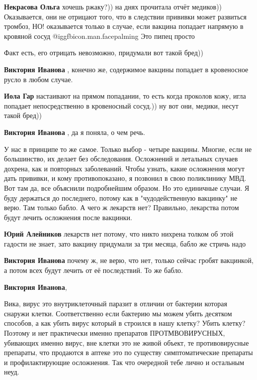 \begin{itemize}
\begin{itemize} %
\textbf{Некрасова Ольга} хочешь ржаку?)) на днях прочитала отчёт медиков))
Оказывается, они не отрицают того, что в следствии прививки может развиться тромбоз, НО! оказывается только в случае, если вакцина попадает напрямую в кровяной сосуд  @igg{fbicon.man.facepalming} 
Это пипец просто

Факт есть, его отрицать невозможно, придумали вот такой бред))

\textbf{Виктория Иванова} , конечно же, содержимое вакцины попадает в кровеносное русло в любом случае.

\textbf{Иола Гар} настаивают на прямом попадании, то есть когда проколов кожу, игла попадает непосредственно в кровеносный сосуд.)) ну вот они, медики, несут такой бред))

\textbf{Виктория Иванова} , да я поняла, о чем речь.
\end{itemize} %


У нас в принципе то же самое. Только выбор - четыре вакцины. Многие, если не
большинство, их делает без обследования. Осложнений и летальных случаев
дохрена, как и повторных заболеваний. Чтобы узнать, какие осложнения могут дать
прививки, и кому противопоказано, я позвонил в свою поликлинику МВД. Вот там
да, все объяснили подробнейшим образом. Но это единичные случаи. Я буду
держаться до последнего, потому как в "чудодейственную вакцинку" не верю. Там
только бабло. А чего ж лекарств нет? Правильно, лекарства потом будут лечить
осложнения после вакцинки.

\begin{itemize} %
\textbf{Юрий Алейников} лекарств нет потому, что никто нихрена толком об этой гадости не знает, зато вакцину придумали за три месяца, бабло же стричь надо

\textbf{Виктория Иванова} почему ж, не верю, что нет, только сейчас гробят вакцинкой, а потом всех будут лечить от её последствий. То же бабло.

\textbf{Виктория Иванова}, 

Вика, вирус это внутриклеточный паразит в отличии от бактерии которая снаружи
клетки. Соответственно если бактерию мы можем убить десятком способов, а как
убить вирус который в строился в нашу клетку? Убить клетку? Поэтому и нет
практически именно препаратов ПРОТМВОВИРУСНЫХ, убивающих именно вирус, вне
клетки это не живой объект, те противовирусные препараты, что продаются в
аптеке это по существу симптоматические препараты и профилактирующие
осложнения. Так что очередной тебе лично и остальным неуд.


\end{itemize}
\end{itemize}
